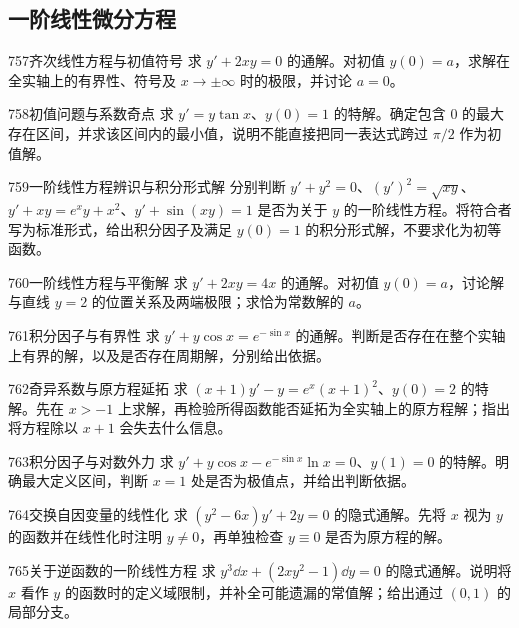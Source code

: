 \subsection{一阶线性微分方程}
\begin{exercise}{757}{齐次线性方程与初值符号}
求 $y'+2xy=0$ 的通解。对初值 $y(0)=a$，求解在全实轴上的有界性、符号及 $x\to\pm\infty$ 时的极限，并讨论 $a=0$。
\end{exercise}
\begin{exercise}{758}{初值问题与系数奇点}
求 $y'=y\tan x$、$y(0)=1$ 的特解。确定包含 $0$ 的最大存在区间，并求该区间内的最小值，说明不能直接把同一表达式跨过 $\pi/2$ 作为初值解。
\end{exercise}
\begin{exercise}{759}{一阶线性方程辨识与积分形式解}
分别判断 $y'+y^2=0$、$(y')^2=\sqrt{xy}$、$y'+xy=e^xy+x^2$、$y'+\sin(xy)=1$ 是否为关于 $y$ 的一阶线性方程。将符合者写为标准形式，给出积分因子及满足 $y(0)=1$ 的积分形式解，不要求化为初等函数。
\end{exercise}
\begin{exercise}{760}{一阶线性方程与平衡解}
求 $y'+2xy=4x$ 的通解。对初值 $y(0)=a$，讨论解与直线 $y=2$ 的位置关系及两端极限；求恰为常数解的 $a$。
\end{exercise}
\begin{exercise}{761}{积分因子与有界性}
求 $y'+y\cos x=e^{-\sin x}$ 的通解。判断是否存在在整个实轴上有界的解，以及是否存在周期解，分别给出依据。
\end{exercise}
\begin{exercise}{762}{奇异系数与原方程延拓}
求 $(x+1)y'-y=e^x(x+1)^2$、$y(0)=2$ 的特解。先在 $x>-1$ 上求解，再检验所得函数能否延拓为全实轴上的原方程解；指出将方程除以 $x+1$ 会失去什么信息。
\end{exercise}
\begin{exercise}{763}{积分因子与对数外力}
求 $y'+y\cos x-e^{-\sin x}\ln x=0$、$y(1)=0$ 的特解。明确最大定义区间，判断 $x=1$ 处是否为极值点，并给出判断依据。
\end{exercise}
\begin{exercise}{764}{交换自因变量的线性化}
求 $(y^2-6x)y'+2y=0$ 的隐式通解。先将 $x$ 视为 $y$ 的函数并在线性化时注明 $y\ne0$，再单独检查 $y\equiv0$ 是否为原方程的解。
\end{exercise}
\begin{exercise}{765}{关于逆函数的一阶线性方程}
求 $y^3\dd x+(2xy^2-1)\dd y=0$ 的隐式通解。说明将 $x$ 看作 $y$ 的函数时的定义域限制，并补全可能遗漏的常值解；给出通过 $(0,1)$ 的局部分支。
\end{exercise}
